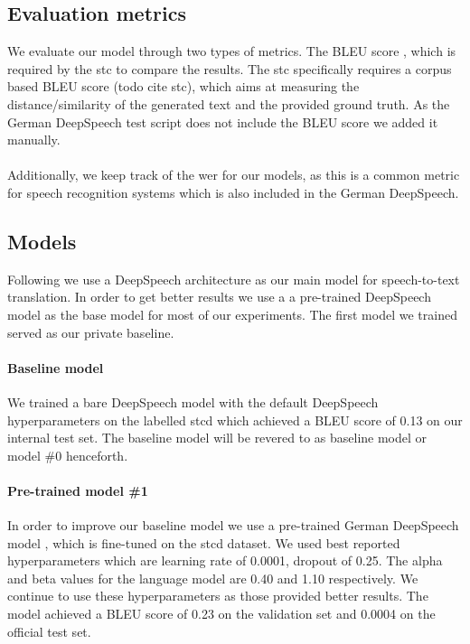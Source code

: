 \subsection{Evaluation metrics}
We evaluate our model through two types of metrics. The BLEU score \cite{Papineni2002BleuAM}, which is required by the \gls{stc} to compare the results. The \gls{stc} specifically requires a corpus
based BLEU score (todo cite stc), which aims at measuring the distance/similarity of the generated text and the provided ground truth. As the German DeepSpeech test script does not include the BLEU score we added it manually. \\~\\Additionally, we keep track of the \gls{wer} for our models, as
this is a common metric for speech recognition systems \cite{Park2008AnEA} which is also included in the German DeepSpeech.


\subsection{Models}
Following  we use a DeepSpeech architecture \cite{Hannun2014DeepSS} as our main model for speech-to-text translation. In order to get better results we use a
a pre-trained DeepSpeech model \cite{DeepSpeechGerman090} as the base model for most of our experiments. The first model we trained served as our private baseline. \paragraph{Baseline model} We trained a bare DeepSpeech model with the default DeepSpeech hyperparameters on the labelled \gls{stcd} which achieved a BLEU score of 0.13 on our internal test set. The baseline model will be revered to as baseline model or model \#0 henceforth.
\paragraph{Pre-trained model \#1} In order to improve our baseline model we use a pre-trained
German DeepSpeech model \cite{DeepSpeechGerman090}, which is fine-tuned on the \gls{stcd} dataset. We used \citet{Agarwal2020LTLUDEAL} best reported hyperparameters which are learning rate of 0.0001, dropout of 0.25. The alpha and beta values for the language model are 0.40 and 1.10 respectively. We continue to use these hyperparameters as those provided better results. The model achieved a BLEU score of
0.23 on the validation set and 0.0004 on the official test set.
